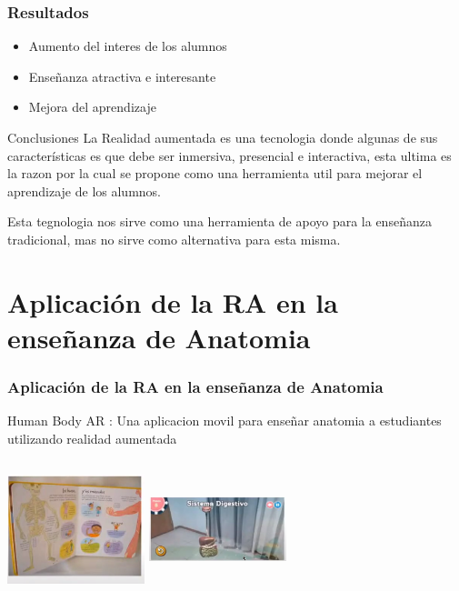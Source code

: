 \documentclass[11pt]{beamer}
\begin{document}
\begin{frame}
\frametitle{Resultados}
\begin{itemize}
\item Aumento del interes de los alumnos
\item Enseñanza atractiva e interesante
\item Mejora del aprendizaje
\end{itemize}

\end{frame}

\begin{frame}{Conclusiones}
La Realidad aumentada es una tecnologia donde algunas de sus características es que debe ser inmersiva, presencial e interactiva, esta ultima es la razon por la cual se propone como una herramienta util para mejorar el aprendizaje de los alumnos.

Esta tegnologia nos sirve como una herramienta de apoyo para la enseñanza tradicional, mas no sirve como alternativa para esta misma.
\end{frame}


\section{Aplicación de la RA en la enseñanza de Anatomia}
\begin{frame}
\frametitle{Aplicación de la RA en la enseñanza de Anatomia}
\center Human Body AR : Una aplicacion movil para enseñar anatomia a estudiantes utilizando realidad aumentada
\center
\begin{itemize}
\end{itemize}
\includegraphics[width=4cm, height=4cm]{img/anatomia.png}
\includegraphics[width=4cm, height=4cm]{img/sistema_digestivo.png}
\end{frame}
\end{document}

